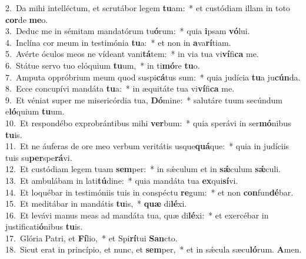 {2.~}Da mihi intelléctum, et scrutábor legem \textbf{tu}am:~* et custódiam illam in toto \textbf{cor}de \textbf{me}o.\\
{3.~}Deduc me in sémitam mandatórum tu\textbf{ó}rum:~* quia \textbf{i}psam \textbf{vó}lui.\\
{4.~}Inclína cor meum in testimónia \textbf{tu}a:~* et non in \textbf{a}va\textbf{rí}tiam.\\
{5.~}Avérte óculos meos ne vídeant vani\textbf{tá}tem:~* in via tua vi\textbf{ví}fi\textbf{ca} me.\\
{6.~}Státue servo tuo elóquium \textbf{tu}um,~* in ti\textbf{mó}re \textbf{tu}o.\\
{7.~}Amputa oppróbrium meum quod suspi\textbf{cá}tus sum:~* quia judícia \textbf{tu}a ju\textbf{cún}da.\\
{8.~}Ecce concupívi mandáta \textbf{tu}a:~* in æquitáte tua vi\textbf{ví}fi\textbf{ca} me.\\
{9.~}Et véniat super me misericórdia tua, \textbf{Dó}mine:~* salutáre tuum secúndum e\textbf{ló}quium \textbf{tu}um.\\
{10.~}Et respondébo exprobrántibus mihi \textbf{ver}bum:~* quia sperávi in ser\textbf{mó}nibus \textbf{tu}is.\\
{11.~}Et ne áuferas de ore meo verbum veritátis usque\textbf{quá}que:~* quia in judíciis tuis su\textbf{per}spe\textbf{rá}vi.\\
{12.~}Et custódiam legem tuam \textbf{sem}per:~* in sǽculum et in \textbf{sǽ}culum \textbf{sǽ}culi.\\
{13.~}Et ambulábam in lati\textbf{tú}dine:~* quia mandáta tua \textbf{ex}qui\textbf{sí}vi.\\
{14.~}Et loquébar in testimóniis tuis in conspéctu \textbf{re}gum:~* et non \textbf{con}fun\textbf{dé}bar.\\
{15.~}Et meditábar in mandátis \textbf{tu}is,~* \textbf{quæ} di\textbf{lé}xi.\\
{16.~}Et levávi manus meas ad mandáta tua, quæ di\textbf{lé}xi:~* et exercébar in justificati\textbf{ó}nibus \textbf{tu}is.\\
{17.~}Glória Patri, et \textbf{Fí}lio,~* et Spi\textbf{rí}tui \textbf{San}cto.\\
{18.~}Sicut erat in princípio, et nunc, et \textbf{sem}per,~* et in sǽcula sæcu\textbf{ló}rum. \textbf{A}men.\\
